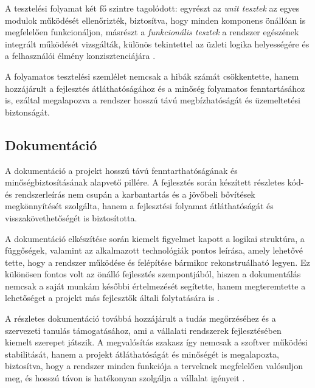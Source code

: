 A tesztelési folyamat két fő szintre tagolódott: egyrészt az \textit{unit tesztek} az egyes modulok működését ellenőrizték, 
biztosítva, hogy minden komponens önállóan is megfelelően funkcionáljon,  
másrészt a \textit{funkcionális tesztek} a rendszer egészének integrált működését vizsgálták, különös tekintettel az üzleti 
logika helyességére és a felhasználói élmény konzisztenciájára \cite{Szalay2018,Hajdu2014}.  

A folyamatos tesztelési szemlélet nemcsak a hibák számát csökkentette, hanem hozzájárult a fejlesztés átláthatóságához és a minőség folyamatos fenntartásához is,  
ezáltal megalapozva a rendszer hosszú távú megbízhatóságát és üzemeltetési biztonságát.

\subsection{Dokumentáció}

A dokumentáció a projekt hosszú távú fenntarthatóságának és minőségbiztosításának alapvető pillére.  
A fejlesztés során készített részletes kód- és rendszerleírás nem csupán a karbantartás és a jövőbeli bővítések megkönnyítését szolgálta,  
hanem a fejlesztési folyamat átláthatóságát és visszakövethetőségét is biztosította.  

A dokumentáció elkészítése során kiemelt figyelmet kapott a logikai struktúra, a függőségek, valamint az alkalmazott technológiák pontos leírása,  
amely lehetővé tette, hogy a rendszer működése és felépítése bármikor rekonstruálható legyen.  
Ez különösen fontos volt az önálló fejlesztés szempontjából, hiszen a dokumentálás nemcsak a saját munkám későbbi értelmezését segítette,  
hanem megteremtette a lehetőséget a projekt más fejlesztők általi folytatására is \cite{Kovacs2016,Kaposi2019,Szalay2018}.  

A részletes dokumentáció továbbá hozzájárult a tudás megőrzéséhez és a szervezeti tanulás támogatásához,  
ami a vállalati rendszerek fejlesztésében kiemelt szerepet játszik.  
A megvalósítás szakasz így nemcsak a szoftver működési stabilitását, hanem a projekt átláthatóságát és minőségét is megalapozta,  
biztosítva, hogy a rendszer minden funkciója a terveknek megfelelően valósuljon meg, és hosszú távon is hatékonyan szolgálja a vállalat igényeit \cite{Hajdu2014}.

